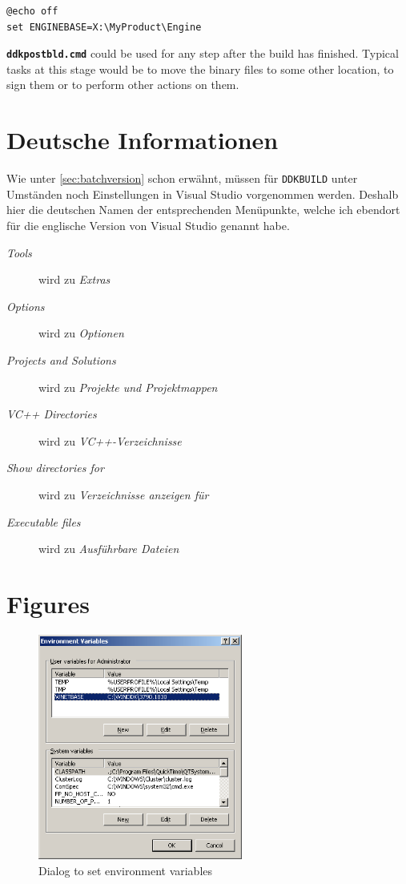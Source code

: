 \documentclass[a4paper,titlepage]{report}
\begin{document}
\begin{verbatim}
@echo off
set ENGINEBASE=X:\MyProduct\Engine
\end{verbatim}

\textbf{\texttt{ddkpostbld.cmd}} could be used for any step after the build has finished. Typical
tasks at this stage would be to move the binary files to some other location, to sign
them or to perform other actions on them.

\chapter{Deutsche Informationen}\thispagestyle{fancy}
Wie unter \ref{sec:batchversion} schon erw\"ahnt, m\"ussen f\"ur \texttt{DDKBUILD}
unter Umst\"anden noch Einstellungen in Visual Studio vorgenommen werden. Deshalb
hier die deutschen Namen der entsprechenden Men\"upunkte, welche ich ebendort f\"ur
die englische Version von Visual Studio genannt habe.

\begin{description}
  \item[\emph{Tools}] wird zu \emph{Extras}
  \item[\emph{Options}] wird zu \emph{Optionen}
  \item[\emph{Projects and Solutions}] wird zu \emph{Projekte und Projektmappen}
  \item[\emph{VC++ Directories}] wird zu \emph{VC++-Verzeichnisse}
  \item[\emph{Show directories for}] wird zu \emph{Verzeichnisse anzeigen f\"ur}
  \item[\emph{Executable files}] wird zu \emph{Ausf\"uhrbare Dateien}
\end{description}

\chapter{Figures}\thispagestyle{fancy}

\begin{figure}[h]
    \centering
    \caption{Dialog to set environment variables\label{fig:EnvironmentVariables}}
    \includegraphics[width=0.6\textwidth]{./EnvironmentVars.png}
\end{figure}
\end{document}
